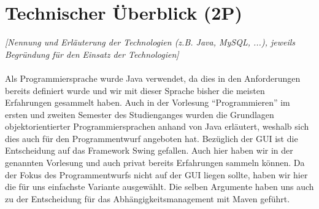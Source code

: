 \newpage
\section{Technischer Überblick (2P)}
\emph{[Nennung und Erläuterung der Technologien (z.B. Java, MySQL, ...), jeweils Begründung für den
Einsatz der Technologien]}
\\
\\
\noindent Als Programmiersprache wurde Java verwendet, da dies in den Anforderungen bereits definiert wurde und wir mit dieser Sprache bisher die meisten Erfahrungen gesammelt haben. Auch in der Vorlesung \enquote{Programmieren} im ersten und zweiten Semester des Studienganges wurden die Grundlagen objektorientierter Programmiersprachen anhand von Java erläutert, weshalb sich dies auch für den Programmentwurf angeboten hat. Bezüglich der GUI ist die Entscheidung auf das Framework Swing gefallen. Auch hier haben wir in der genannten Vorlesung und auch privat bereits Erfahrungen sammeln können. Da der Fokus des Programmentwurfs nicht auf der GUI liegen sollte, haben wir hier die für uns einfachste Variante ausgewählt. Die selben Argumente haben uns auch zu der Entscheidung für das Abhängigkeitsmanagement mit Maven geführt.